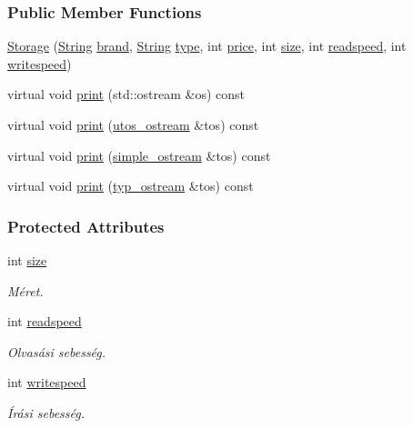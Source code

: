 \subsubsection*{Public Member Functions}
\begin{DoxyCompactItemize}
\item 
\mbox{\hyperlink{class_storage_a502a2ec76e09d48a87da6ed1b91cdaa8}{Storage}} (\mbox{\hyperlink{class_string}{String}} \mbox{\hyperlink{class_part_ae06f2fdeb7fbbdb229a7aca151f3e341}{brand}}, \mbox{\hyperlink{class_string}{String}} \mbox{\hyperlink{class_part_a101dbcc5c4b21564df7414c7eb0eae88}{type}}, int \mbox{\hyperlink{class_part_a8e71223aed1da95a974f33d8d6c91bb1}{price}}, int \mbox{\hyperlink{class_storage_abcc80ce58a21fa884035617ee0b6cb67}{size}}, int \mbox{\hyperlink{class_storage_a41073842ff16961dad3903e6dd49bb0c}{readspeed}}, int \mbox{\hyperlink{class_storage_a0198a1483ccf849d48c76da88599ba8b}{writespeed}})
\item 
virtual void \mbox{\hyperlink{class_storage_aa9f6ffb0fd45839b54bd4e254270445d}{print}} (std\+::ostream \&os) const
\item 
virtual void \mbox{\hyperlink{class_storage_ab7ecf9e0777891b4e1a84bbf391a1cd4}{print}} (\mbox{\hyperlink{structutos__ostream}{utos\+\_\+ostream}} \&tos) const
\item 
virtual void \mbox{\hyperlink{class_storage_a53fc5b4814df41517b9f2be8dcef605e}{print}} (\mbox{\hyperlink{structsimple__ostream}{simple\+\_\+ostream}} \&tos) const
\item 
virtual void \mbox{\hyperlink{class_storage_ad6c13f251a39612a7628980bf2f12918}{print}} (\mbox{\hyperlink{structtyp__ostream}{typ\+\_\+ostream}} \&tos) const
\end{DoxyCompactItemize}
\subsubsection*{Protected Attributes}
\begin{DoxyCompactItemize}
\item 
int \mbox{\hyperlink{class_storage_abcc80ce58a21fa884035617ee0b6cb67}{size}}
\begin{DoxyCompactList}\small\item\em Méret. \end{DoxyCompactList}\item 
int \mbox{\hyperlink{class_storage_a41073842ff16961dad3903e6dd49bb0c}{readspeed}}
\begin{DoxyCompactList}\small\item\em Olvasási sebesség. \end{DoxyCompactList}\item 
int \mbox{\hyperlink{class_storage_a0198a1483ccf849d48c76da88599ba8b}{writespeed}}
\begin{DoxyCompactList}\small\item\em Írási sebesség. \end{DoxyCompactList}\end{DoxyCompactItemize}


